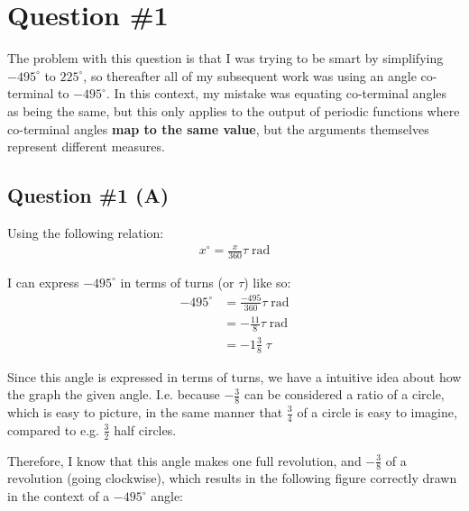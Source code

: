 \section*{Question \#1}



The problem with this question is that I was trying to be smart by simplifying $-495^\circ$ to $225^\circ$, so thereafter all of my subsequent work was using an angle co-terminal to $-495^\circ$. In this context, my mistake was equating co-terminal angles as being the same, but this only applies to the output of periodic functions where co-terminal angles \textbf{map to the same value}, but the arguments themselves represent different measures.

\subsection*{Question \#1 (A)}

Using the following relation:
\begin{equation}
\begin{split}
x^{\circ} = \frac{x}{360} \tau \; {\displaystyle {\text{rad}}}
\end{split}
\end{equation}

I can express $-495^\circ$ in terms of turns (or $\tau$) like so:
\begin{equation}
\begin{split}
-495^{\circ} &= \frac{-495}{360} \tau \; {\displaystyle {\text{rad}}} \\
    &= -\frac{11}{8} \tau \; {\displaystyle {\text{rad}}} \\
    &= - 1\frac{3}{8} \; \tau
\end{split}
\end{equation}

Since this angle is expressed in terms of turns, we have a intuitive idea about how the graph the given angle. I.e. because $-\frac{3}{8}$ can be considered a ratio of a circle, which is easy to picture, in the same manner that $\frac{3}{4}$ of a circle is easy to imagine, compared to e.g. $\frac{3}{2}$ half circles.

\newpage

Therefore, I know that this angle makes one full revolution, and $-\frac{3}{8}$ of a revolution (going clockwise), which results in the following figure correctly drawn in the context of a $-495^\circ$ angle:


